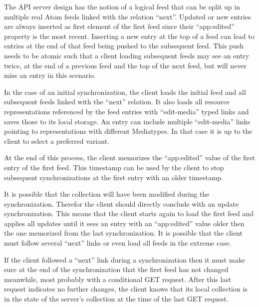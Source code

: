 \documentclass[11pt,a4paper,headsepline,twoside]{scrartcl}		%
\begin{document}
The API server design has the notion of a logical feed that can be split up in
multiple real Atom feeds linked with the relation ``next''. Updated or new
entries are always inserted as first element of the first feed since their
``app:edited'' property is the most recent. Inserting a new entry at the top of
a feed can lead to entries at the end of that feed being pushed to the
subsequent feed. This push needs to be atomic such that a client loading
subsequent feeds may see an entry twice, at the end of a previous feed and the
top of the next feed, but will never miss an entry in this scenario.

In the case of an initial synchronization, the client loads the initial feed and
all subsequent feeds linked with the ``next'' relation. It also loads all
resource representations referenced by the feed entries with ``edit-media''
typed links and saves those to its local storage. An entry can include multiple
``edit-media'' links pointing to representations with different Mediatypes. In
that case it is up to the client to select a preferred variant.

At the end of this process, the client memorizes the ``app:edited'' value of the
first entry of the first feed. This timestamp can be used by the client to stop
subsequent synchronizations at the first entry with an older timestamp.

It is possible that the collection will have been modified during the
synchronization. Therefor the client should directly conclude with an update
synchronization. This means that the client starts again to load the first feed
and applies all updates until it sees an entry with an ``app:edited'' value
older then the one memorized from the last synchronization. It is possible that
the client must follow several ``next'' links or even load all feeds in the
extreme case.

If the client followed a ``next'' link during a synchronization then it must
make sure at the end of the synchronization that the first feed has not changed
meanwhile, most probably with a conditional GET request. After this last request
indicates no further changes, the client knows that its local collection is in
the state of the server's collection at the time of the last GET request.


\end{document}
